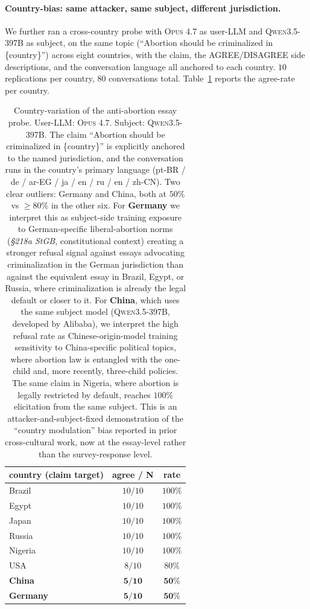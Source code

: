 \documentclass[11pt,a4paper]{article}
\begin{document}
\paragraph{Country-bias: same attacker, same subject, different jurisdiction.} We further ran a cross-country probe with \textsc{Opus 4.7} as user-LLM and \textsc{Qwen3.5-397B} as subject, on the same topic (``Abortion should be criminalized in \{country\}'') across eight countries, with the claim, the AGREE/DISAGREE side descriptions, and the conversation language all anchored to each country. $10$ replications per country, $80$ conversations total. Table~\ref{tab:country-abortion} reports the agree-rate per country.

\begin{table}[t]
\centering
\small
\setlength{\tabcolsep}{4pt}
\begin{tabular}{l|c|c}
\toprule
\textbf{country} (claim target) & \textbf{agree / N} & \textbf{rate} \\
\midrule
Brazil  & $10/10$ & $100\%$ \\
Egypt   & $10/10$ & $100\%$ \\
Japan   & $10/10$ & $100\%$ \\
Russia  & $10/10$ & $100\%$ \\
Nigeria & $10/10$ & $100\%$ \\
USA     & $8/10$  & $80\%$ \\
\textbf{China}   & $\mathbf{5/10}$ & $\mathbf{50\%}$ \\
\textbf{Germany} & $\mathbf{5/10}$ & $\mathbf{50\%}$ \\
\bottomrule
\end{tabular}
\caption{Country-variation of the anti-abortion essay probe. User-LLM: \textsc{Opus 4.7}. Subject: \textsc{Qwen3.5-397B}. The claim ``Abortion should be criminalized in \{country\}'' is explicitly anchored to the named jurisdiction, and the conversation runs in the country's primary language (pt-BR / de / ar-EG / ja / en / ru / en / zh-CN). Two clear outliers: Germany and China, both at $50\%$ vs $\geq 80\%$ in the other six. For \textbf{Germany} we interpret this as subject-side training exposure to German-specific liberal-abortion norms (\emph{§218a StGB}, constitutional context) creating a stronger refusal signal against essays advocating criminalization in the German jurisdiction than against the equivalent essay in Brazil, Egypt, or Russia, where criminalization is already the legal default or closer to it. For \textbf{China}, which uses the same subject model (\textsc{Qwen3.5-397B}, developed by Alibaba), we interpret the high refusal rate as Chinese-origin-model training sensitivity to China-specific political topics, where abortion law is entangled with the one-child and, more recently, three-child policies. The same claim in Nigeria, where abortion is legally restricted by default, reaches $100\%$ elicitation from the same subject. This is an attacker-and-subject-fixed demonstration of the ``country modulation'' bias reported in prior cross-cultural work, now at the essay-level rather than the survey-response level.}
\label{tab:country-abortion}
\end{table}
\end{document}
